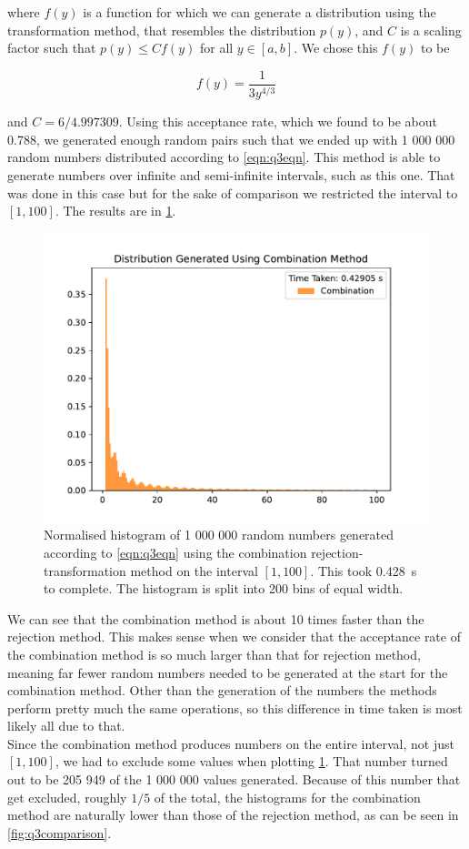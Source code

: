 \documentclass[11pt]{article}
\begin{document}
\begin{enumerate}
    where $f(y)$ is a function for which we can generate a distribution using the transformation method, that resembles the distribution $p(y)$, and $C$ is a scaling factor such that $p(y)\leq Cf(y)$ for all $y\in[a,b]$. We chose this $f(y)$ to be 

    \begin{equation}
        f(y)=\frac{1}{3y^{4/3}}
        \label{eqn:q3f}
    \end{equation}

    and $C=6/4.997309$. Using this acceptance rate, which we found to be about 0.788, we generated enough random pairs such that we ended up with 1 000 000 random numbers distributed according to \cref{eqn:q3eqn}. This method is able to generate numbers over infinite and semi-infinite intervals, such as this one. That was done in this case but for the sake of comparison we restricted the interval to $[1,100]$. The results are in \cref{fig:q3combo}.

    \begin{figure}[h]
        \begin{center}
            \includegraphics[width=.6\textwidth]{Plots/q3combo.pdf}
            \caption{Normalised histogram of 1 000 000 random numbers generated according to \cref{eqn:q3eqn} using the combination rejection-transformation method on the interval $[1,100]$. This took \SI{0.428}{\second} to complete. The histogram is split into 200 bins of equal width.}
            \label{fig:q3combo}
        \end{center}
    \end{figure}

    We can see that the combination method is about 10 times faster than the rejection method. This makes sense when we consider that the acceptance rate of the combination method is so much larger than that for rejection method, meaning far fewer random numbers needed to be generated at the start for the combination method. Other than the generation of the numbers the methods perform pretty much the same operations, so this difference in time taken is most likely all due to that.\\
    Since the combination method produces numbers on the entire interval, not just $[1,100]$, we had to exclude some values when plotting \cref{fig:q3combo}. That number turned out to be 205 949 of the 1 000 000 values generated. Because of this number that get excluded, roughly $1/5$ of the total, the histograms for the combination method are naturally lower than those of the rejection method, as can be seen in \cref{fig:q3comparison}.


\end{enumerate}
\end{document}
